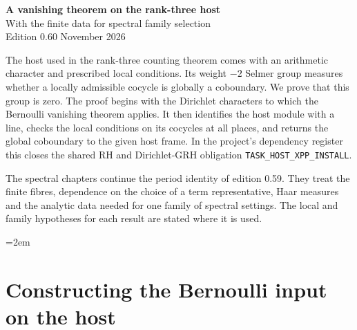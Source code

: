 \begin{center}
{\Large\bfseries A vanishing theorem on the rank-three host}\\[5pt]
{\large With the finite data for spectral family selection}\\[4pt]
Edition 0.60  November 2026
\end{center}

The host used in the rank-three counting theorem comes with an
arithmetic character and prescribed local conditions. Its
weight $-2$ Selmer group measures whether a locally admissible
cocycle is globally a coboundary. We prove that this group is zero.
The proof begins with the Dirichlet characters to which the Bernoulli
vanishing theorem applies. It then identifies the host module with a
line, checks the local conditions on its cocycles at all places,
and returns the global coboundary to the given host frame.
In the project's dependency register this closes the shared
RH and Dirichlet-GRH obligation \texttt{TASK\_HOST\_XPP\_INSTALL}.

The spectral chapters continue the period identity of edition 0.59.
They treat the finite fibres, dependence on the choice of a term
representative, Haar measures and the analytic data needed for one
family of spectral settings. The local and family hypotheses for each
result are stated where it is used.

\begingroup\emergencystretch=2em
\section{Constructing the Bernoulli input on the host}




\endgroup
